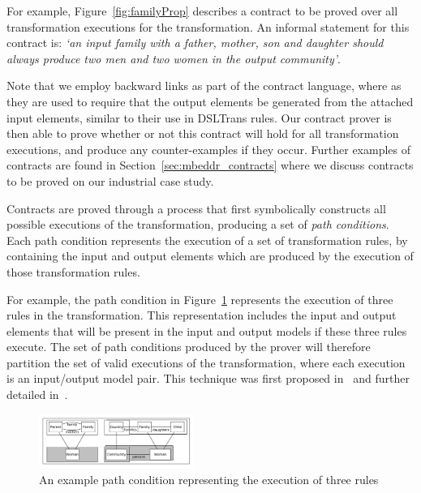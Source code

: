 For example, Figure~\ref{fig:familyProp} describes a contract to be proved over all transformation executions for the \FTP transformation. An informal statement for this contract is: \textit{`an input family with a father, mother, son and daughter should always produce
two men and two women in the output community'}.

Note that we employ backward links as part of the contract language, where as they are used to require that the output elements be generated from the attached input elements, similar to their use in DSLTrans rules. Our contract prover is then
able to prove whether or not this contract will hold for all transformation executions, and produce any counter-examples if they occur. Further examples of contracts are found in Section~\ref{sec:mbeddr_contracts} where we discuss contracts to be proved on our industrial case study.


 Contracts are proved through a process that first symbolically constructs all
 possible executions of the transformation, producing a set of \emph{path conditions}. Each path condition represents the execution of a set of transformation rules, by containing the input and output elements which are produced by the execution of those transformation rules.

 For example, the path condition in Figure~\ref{fig:pc_first} represents the execution of three rules in the transformation. This representation includes the input and output elements that will be present in the input and output models if these three rules execute. The set of path conditions produced by the prover will therefore partition the set of valid executions of the transformation, where each execution is an input/output model pair. This technique was first proposed in~\cite{Lucio2010} and further detailed in~\cite{Lucio2014}.

   \begin{figure}[t]
     \begin{center}
       \includegraphics[width=0.45\textwidth]{figures/contract_proving/pc}
       \caption{An example path condition representing the execution of three rules}
       \label{fig:pc_first}
     \end{center}
     \vspace{-0.20in}
   \end{figure}

